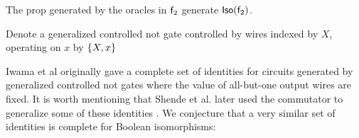 



\begin{lemma}\cite[Thm. 5.1]{toffolireversible}
The prop generated by the oracles in $\mathsf{f}_2$ generate ${\sf Iso}(\mathsf{f}_2)$.
\end{lemma}


Denote a generalized controlled not gate controlled by wires indexed by $X$, operating on $x$ by $\{ X,x\}$


%
%






Iwama et al \cite{iwama} originally gave a complete set of identities for circuits generated by generalized controlled not gates where the value of all-but-one output wires are fixed.  It is worth mentioning that Shende et al. later used the commutator to generalize some of these identities \cite[Cor. 26]{shende}.  We conjecture that a very similar set of identities is complete for Boolean isomorphisms: 



